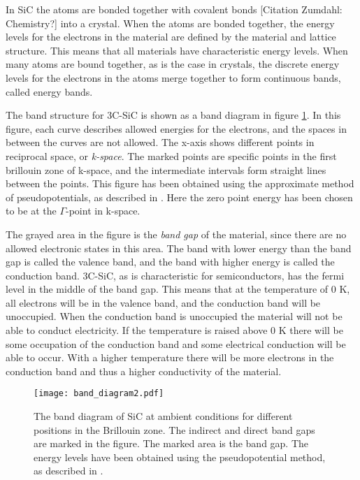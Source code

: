 In SiC the atoms are bonded together with covalent bonds [Citation Zumdahl: Chemistry?] into a crystal. When the atoms are bonded together, the energy levels for the electrons in the material are defined by the material and lattice structure. This means that all materials have characteristic energy levels. When many atoms are bound together, as is the case in crystals, the discrete energy levels for the electrons in the atoms merge together to form continuous bands, called energy bands. 

The band structure for 3C-SiC is shown as a band diagram in figure \ref{fig:band}. In this figure, each curve describes allowed energies for the electrons, and the spaces in between the curves are not allowed. The x-axis shows different points in reciprocal space, or \emph{k-space}. The marked points are specific points in the first brillouin zone of k-space, and the intermediate intervals form straight lines between the points. This figure has been obtained using the approximate method of pseudopotentials, as described in \cite{Aourag1994}. Here the zero point energy has been chosen to be at the $\Gamma$-point in k-space. 

The grayed area in the figure is the \emph{band gap} of the material, since there are no allowed electronic states in this area. The band with lower energy than the band gap is called the valence band, and the band with higher energy is called the conduction band. 3C-SiC, as is characteristic for semiconductors, has the fermi level in the middle of the band gap. This means that at the temperature of 0 K, all electrons will be in the valence band, and the conduction band will be unoccupied. When the conduction band is unoccupied the material will not be able to conduct electricity. If the temperature is raised above 0 K there will be some occupation of the conduction band and some electrical conduction will be able to occur. With a higher temperature there will be more electrons in the conduction band and thus a higher conductivity of the material. 

\begin{figure}[h]
\begin{center}
\texttt{[image: band\_diagram2.pdf]}
\caption{The band diagram of SiC at ambient conditions for different positions in the Brillouin zone. The indirect and direct band gaps are marked in the figure. The marked area is the band gap. The energy levels have been obtained using the pseudopotential method, as described in \cite{Aourag1994}.
\label{fig:band}}
\end{center}
\end{figure}

